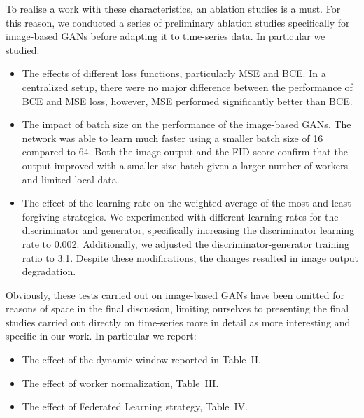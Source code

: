 \documentclass{article}
\begin{document}
\AR To realise a work with these characteristics, an ablation studies is a must. For this reason, we conducted a series of preliminary ablation studies specifically for image-based GANs before adapting it to time-series data. In particular we studied:
\begin{itemize}
    \item The effects of different loss functions, particularly MSE and BCE. In a centralized setup, there were no major difference between the performance of BCE and MSE loss, however, MSE performed significantly better than BCE. 
    \item The impact of batch size on the performance of the image-based GANs. The network was able to learn much faster using a smaller batch size of 16 compared to 64. Both the image output and the FID score confirm that the output improved with a smaller size batch given a larger number of workers and limited local data.
    \item The effect of the learning rate on the weighted average of the most and least forgiving strategies. We experimented with different learning rates for the discriminator and generator, specifically increasing the discriminator learning rate to 0.002. Additionally, we adjusted the discriminator-generator training ratio to 3:1. Despite these modifications, the changes resulted in image output degradation.
\end{itemize}
Obviously, these tests carried out on image-based GANs have been omitted for reasons of space in the final discussion, limiting ourselves to presenting the final studies carried out directly on time-series more in detail as more interesting and specific in our work.
In particular we report:
\begin{itemize}
    \item The effect of the dynamic window reported in Table~II.
    \item The effect of worker normalization, Table~III.
    \item The effect of Federated Learning strategy, Table~IV.
\end{itemize}
\end{document}

